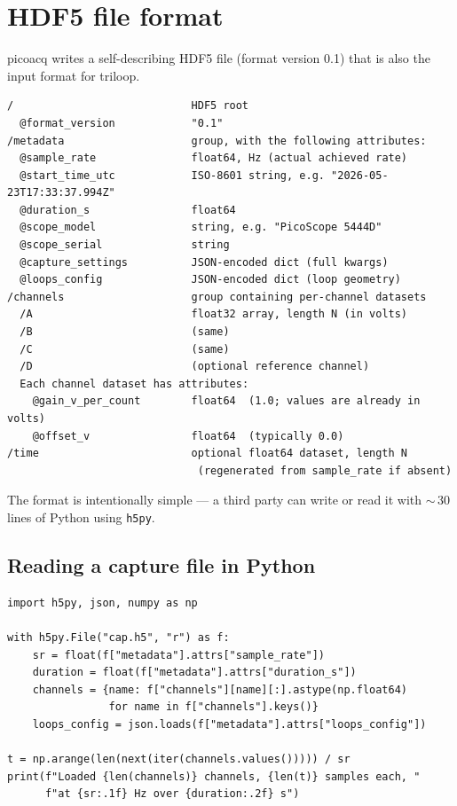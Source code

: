 \documentclass[11pt]{article}
\begin{document}
\section{HDF5 file format}
\label{sec:fileformat}

\textsf{picoacq} writes a self-describing HDF5 file (format version
0.1) that is also the input format for \textsf{triloop}.

\begin{lstlisting}[style=shell]
/                            HDF5 root
  @format_version            "0.1"
/metadata                    group, with the following attributes:
  @sample_rate               float64, Hz (actual achieved rate)
  @start_time_utc            ISO-8601 string, e.g. "2026-05-23T17:33:37.994Z"
  @duration_s                float64
  @scope_model               string, e.g. "PicoScope 5444D"
  @scope_serial              string
  @capture_settings          JSON-encoded dict (full kwargs)
  @loops_config              JSON-encoded dict (loop geometry)
/channels                    group containing per-channel datasets
  /A                         float32 array, length N (in volts)
  /B                         (same)
  /C                         (same)
  /D                         (optional reference channel)
  Each channel dataset has attributes:
    @gain_v_per_count        float64  (1.0; values are already in volts)
    @offset_v                float64  (typically 0.0)
/time                        optional float64 dataset, length N
                              (regenerated from sample_rate if absent)
\end{lstlisting}

The format is intentionally simple --- a third party can write or read
it with $\sim$\,30 lines of Python using \texttt{h5py}.

\subsection{Reading a capture file in Python}

\begin{lstlisting}[style=py]
import h5py, json, numpy as np

with h5py.File("cap.h5", "r") as f:
    sr = float(f["metadata"].attrs["sample_rate"])
    duration = float(f["metadata"].attrs["duration_s"])
    channels = {name: f["channels"][name][:].astype(np.float64)
                for name in f["channels"].keys()}
    loops_config = json.loads(f["metadata"].attrs["loops_config"])

t = np.arange(len(next(iter(channels.values())))) / sr
print(f"Loaded {len(channels)} channels, {len(t)} samples each, "
      f"at {sr:.1f} Hz over {duration:.2f} s")
\end{lstlisting}
\end{document}
